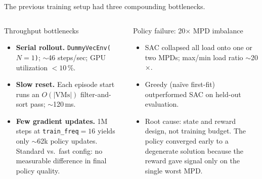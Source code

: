 \documentclass[11pt,aspectratio=43]{beamer}
\begin{document}
\begin{frame}{The previous training setup had three compounding bottlenecks.}

  \begin{columns}[T,onlytextwidth]
      \begin{block}{Throughput bottlenecks}
        \small
        \begin{itemize}
          \item \textbf{Serial rollout.} \texttt{DummyVecEnv($N=1$)};
                $\sim$46 steps/sec; GPU utilization ${<}10\,\%$.
          \item \textbf{Slow reset.} Each episode start runs an
                $O(|\text{VMs}|)$ filter-and-sort pass; $\sim$120\,ms.
          \item \textbf{Few gradient updates.} 1M steps at
                \texttt{train\_freq}$=16$ yields only $\sim$62k
                policy updates. Standard vs.\ fast config:
                no measurable difference in final policy quality.
        \end{itemize}
      \end{block}

      \begin{block}{Policy failure: 20$\times$ MPD imbalance}
        \small
        \begin{itemize}
          \item SAC collapsed all load onto one or two MPDs;
                max/min load ratio $\sim$20$\times$.
          \item Greedy (na\"ive first-fit) outperformed SAC
                on held-out evaluation.
          \item Root cause: state and reward design, not
                training budget. The policy converged early
                to a degenerate solution because the reward
                gave signal only on the single worst MPD.
        \end{itemize}
      \end{block}
  \end{columns}

\end{frame}

\end{document}
